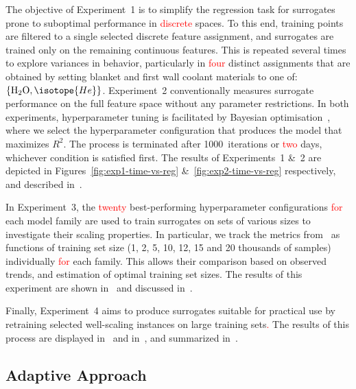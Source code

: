 The objective of Experiment~1 is to simplify the regression task for
surrogates prone to suboptimal performance in \textcolor{red}{discrete} spaces.
To this end, training points are filtered to a single selected discrete feature
assignment, and surrogates are trained only on the remaining continuous features.
This is repeated several times to explore variances in behavior,
particularly in \textcolor{red}{four} distinct assignments that are obtained by setting blanket and
first wall coolant materials to one
of:~$\{\text{H\textsubscript{2}O},\isotope{He}\}$.
Experiment~2 conventionally measures surrogate performance on the full feature
space without any parameter restrictions. In both experiments, hyperparameter tuning is
facilitated by Bayesian optimisation~\cite{movckus1975bayesian}, where we select the
hyperparameter configuration that produces the model that maximizes $R^2$. The
process is terminated after 1000~iterations or \textcolor{red}{two} days, whichever condition is satisfied first.
The results of Experiments~1 \&~2 are depicted
in Figures~\ref{fig:exp1-time-vs-reg} \&~\ref{fig:exp2-time-vs-reg}
respectively, and described in~.

In Experiment~3, the \textcolor{red}{twenty} best-performing hyperparameter configurations
\textcolor{red}{for} each model family are used to train surrogates on sets of various sizes to
investigate their scaling properties. In particular, we track the metrics
from~ as functions of training set size (1, 2, 5, 10, 12, 15 and 20 thousands
of samples) individually \textcolor{red}{for} each family. This allows their comparison based on
observed trends, and estimation of optimal training set sizes.
The results of this experiment are shown in~ and discussed
in~.

Finally, Experiment~4 aims
to produce surrogates suitable for practical use by retraining selected
well-scaling instances on large training sets\textcolor{red}{.}
The results of this process are displayed in~ and
in~, and summarized in~.


\subsection{Adaptive Approach}\label{sec:adaptive}


